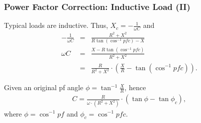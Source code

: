 \documentclass{beamer}
\begin{document}
\begin{frame}[fragile]
\frametitle{Power Factor Correction: Inductive Load (II)}

%

Typical loads are inductive. Thus, $X_c = -\frac{1}{\omega C}$
and
\begin{eqnarray}
-\frac{1}{\omega C} &=& \frac{R^2 + X^2}{R \tan(\cos^{-1} pfc) - X}
\nonumber \\
\omega C &=& \frac{X - R \tan(\cos^{-1} pfc)}{R^2 + X^2}
\nonumber \\
&=& \frac{R}{R^2 + X^2} \cdot \left( \frac{X}{R} - \tan(\cos^{-1} pfc) \right)
\nonumber .
\end{eqnarray}

Given an original pf angle $\phi = \tan^{-1} \frac{X}{R}$, 
hence 
\begin{eqnarray}
C = \frac{R}{\omega \cdot (R^2 + X^2)} \cdot \left( \tan \phi - \tan \phi_c \right)
\label{eq: pfc C},
\end{eqnarray}
where $\phi = \cos^{-1} pf$ and $\phi_c = \cos^{-1} pfc$.

\end{frame}

\end{document}
